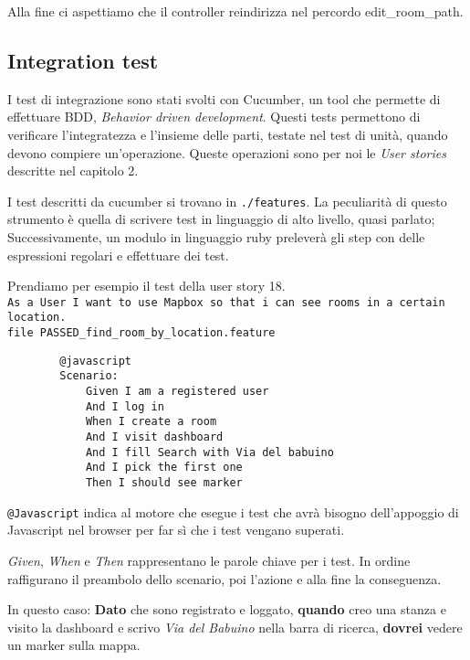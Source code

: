 	Alla fine ci aspettiamo che il controller reindirizza nel percordo edit\_room\_path.
	
	\subsection{Integration test}
	
	I test di integrazione sono stati svolti con Cucumber, un tool che permette di effettuare BDD, \textit{Behavior driven development}. Questi tests permettono di verificare l'integratezza e l'insieme delle parti, testate nel test di unità, quando devono compiere un'operazione. Queste operazioni sono per noi le \textit{User stories} descritte nel capitolo 2.
			
	I test descritti da cucumber si trovano in \texttt{./features}. La peculiarità di questo strumento è quella di scrivere test in linguaggio di alto livello, quasi parlato; Successivamente, un modulo in linguaggio ruby preleverà gli step con delle espressioni regolari e effettuare dei test.
	
	Prendiamo per esempio il test della user story 18.
	\\
	\texttt{As a User I want to use Mapbox so that i can see rooms in a certain location.}\\
	\texttt{file PASSED\_find\_room\_by\_location.feature}
	\begin{lstlisting}
		@javascript
		Scenario:
			Given I am a registered user
			And I log in
			When I create a room
			And I visit dashboard
			And I fill Search with Via del babuino
			And I pick the first one
			Then I should see marker
	\end{lstlisting}
	
	\texttt{@Javascript} indica al motore che esegue i test che avrà bisogno dell'appoggio di Javascript nel browser per far sì che i test vengano superati.
	
	\textit{Given}, \textit{When} e \textit{Then} rappresentano le parole chiave per i test. In ordine raffigurano il preambolo dello scenario, poi l'azione e alla fine la conseguenza.
	
	In questo caso: \textbf{Dato} che sono registrato e loggato, \textbf{quando} creo una stanza e visito la dashboard e scrivo \textit{Via del Babuino} nella barra di ricerca,\textbf{ dovrei} vedere un marker sulla mappa.